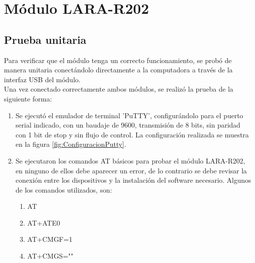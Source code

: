 \section{Módulo LARA-R202}
\subsection{Prueba unitaria}
Para verificar que el módulo tenga un correcto funcionamiento, se probó de manera unitaria conectándolo directamente a la computadora a través de la interfaz USB del módulo.\\ %
%
	
Una vez conectado correctamente ambos módulos, se realizó la prueba de la siguiente forma:
\begin{enumerate}
	\item Se ejecutó el emulador de terminal ’PuTTY’, configurándolo para el puerto serial
	indicado, con un baudaje de 9600, transmisión de 8 bits, sin paridad con 1 bit de
	stop y sin flujo de control. La configuración realizada se muestra en la figura \ref{fig:ConfiguracionPutty}.
	\item Se ejecutaron los comandos AT básicos para probar el módulo LARA-R202, en ninguno de ellos
	debe aparecer un error, de lo contrario se debe revisar la conexión entre los dispositivos
	y la instalación del software necesario. Algunos de los comandos utilizados, son:

		\begin{enumerate}
			\item AT
			\item AT+ATE0
			\item AT+CMGF=1
			\item AT+CMGS=""
		\end{enumerate}	
\end{enumerate}
 
